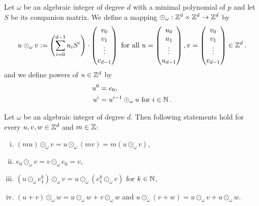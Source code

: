 \begin{defn}
Let $\omega$ be an algebraic integer of degree $d$ with a minimal polynomial of $p$ and let $S$ be its companion matrix. We define a mapping $\odot_\omega: \mathbb{Z}^d \times \mathbb{Z}^d \rightarrow \mathbb{Z}^d$ by 
$$
u \odot_\omega v := \left(\sum_{i=0}^{d-1} {u}_i S^i\right)\cdot \begin{pmatrix} {v}_0 \\ {v}_1 \\ \vdots \\ {v}_{d-1} \end{pmatrix} \text{ for all } u=\begin{pmatrix} {u}_0 \\ {u}_1 \\ \vdots \\ {u}_{d-1} \end{pmatrix}, v=\begin{pmatrix} {v}_0 \\ {v}_1 \\ \vdots \\ {v}_{d-1} \end{pmatrix} \in \mathbb{Z}^d\,.
$$ 
and we define powers of $u \in \mathbb{Z}^d$ by
\begin{align*}
    u^0&=e_0, \\
    u^{i}&= u^{i-1} \odot_\omega u \text{ for } i\in\mathbb{N}\,.
\end{align*}
\end{defn}

\begin{lem}
\label{lem:multInZd}
Let $\omega$ be an algebraic integer of degree $d$. Then following statements hold for every $u,v,w\in \mathbb{Z}^d$ and $m\in\mathbb{Z}$:
\begin{enumerate}[(i)]
    \item $(mu)\odot_\omega v = u \odot_\omega (m v)= m (u\odot_\omega v)$,
    \item $e_0 \odot_\omega v= v \odot_\omega e_0 =v$,
    \item $(u \odot_\omega e_1^k)\odot_\omega v = u \odot_\omega (e_1^k\odot_\omega v)$ for $k\in\mathbb{N}$,
    \item $(u+v)\odot_\omega w =u\odot_\omega w + v\odot_\omega w$ and $u \odot_\omega (v+w)= u \odot_\omega v +u\odot_\omega w$.
\end{enumerate}
\end{lem}

